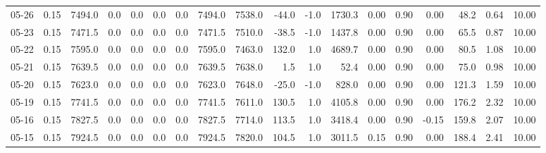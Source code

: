 \begin{threeparttable}
{\begin{tabular}{lrrrrrrrrrrrrrrrrr}
  05-26 &     0.15 & 7494.0 &               0.0 &               0.0 &                0.0 &                0.0 & 7494.0 & 7538.0 &      -44.0 &                     -1.0 &              1730.3 &       0.00 &      0.90 &           0.00 &             48.2 &            0.64 &                  10.00 \\
  05-23 &     0.15 & 7471.5 &               0.0 &               0.0 &                0.0 &                0.0 & 7471.5 & 7510.0 &      -38.5 &                     -1.0 &              1437.8 &       0.00 &      0.90 &           0.00 &             65.5 &            0.87 &                  10.00 \\
  05-22 &     0.15 & 7595.0 &               0.0 &               0.0 &                0.0 &                0.0 & 7595.0 & 7463.0 &      132.0 &                      1.0 &              4689.7 &       0.00 &      0.90 &           0.00 &             80.5 &            1.08 &                  10.00 \\
  05-21 &     0.15 & 7639.5 &               0.0 &               0.0 &                0.0 &                0.0 & 7639.5 & 7638.0 &        1.5 &                      1.0 &                52.4 &       0.00 &      0.90 &           0.00 &             75.0 &            0.98 &                  10.00 \\
  05-20 &     0.15 & 7623.0 &               0.0 &               0.0 &                0.0 &                0.0 & 7623.0 & 7648.0 &      -25.0 &                     -1.0 &               828.0 &       0.00 &      0.90 &           0.00 &            121.3 &            1.59 &                  10.00 \\
  05-19 &     0.15 & 7741.5 &               0.0 &               0.0 &                0.0 &                0.0 & 7741.5 & 7611.0 &      130.5 &                      1.0 &              4105.8 &       0.00 &      0.90 &           0.00 &            176.2 &            2.32 &                  10.00 \\
  05-16 &     0.15 & 7827.5 &               0.0 &               0.0 &                0.0 &                0.0 & 7827.5 & 7714.0 &      113.5 &                      1.0 &              3418.4 &       0.00 &      0.90 &          -0.15 &            159.8 &            2.07 &                  10.00 \\
  05-15 &     0.15 & 7924.5 &               0.0 &               0.0 &                0.0 &                0.0 & 7924.5 & 7820.0 &      104.5 &                      1.0 &              3011.5 &       0.15 &      0.90 &           0.00 &            188.4 &            2.41 &                  10.00 \\

\end{tabular}}
\end{threeparttable}
